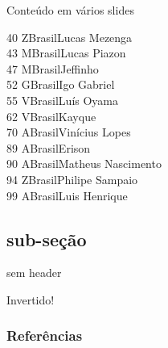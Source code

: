 \documentclass[aspectratio=169]{beamer}
\begin{document}
\begin{frame}[allowframebreaks]{Conteúdo em vários slides}
\begin{tabbing}
40	\>Z\>Brasil\>Lucas Mezenga \\	
43	\>M\>Brasil\>Lucas Piazon	\\
47	\>M\>Brasil\>Jeffinho \\
52	\>G\>Brasil\>Igo Gabriel \\
55	\>V\>Brasil\>Luís Oyama \\
62	\>V\>Brasil\>Kayque \\
70	\>A\>Brasil\>Vinícius Lopes \\
89	\>A\>Brasil\>Erison \\
90	\>A\>Brasil\>Matheus Nascimento \\
94	\>Z\>Brasil\>Philipe Sampaio \\
99	\>A\>Brasil\>Luis Henrique \\
\end{tabbing}

\end{frame}

\subsection{sub-seção}
	
\begin{frame}[plain]
 sem header
\end{frame}

\begin{frame}[standout]
	Invertido!
\end{frame}

\appendix %

\begin{frame}[allowframebreaks]
    \frametitle{Referências}
    \nocite{*} %
    
    
    
    
\end{frame}
\end{document}
